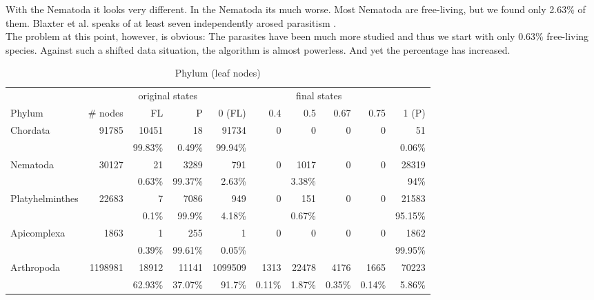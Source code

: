       With the Nematoda it looks very different. In the Nematoda its much worse. Most Nematoda are 
        free-living, but we found only 2.63\% of them. Blaxter et al. speaks of at least seven 
        independently arosed parasitism \cite{Blaxter1998}. \\
        The problem at this point, however, is obvious: The parasites have been much more studied and 
        thus we start with only 0.63\% free-living species. Against such a shifted data situation, the 
        algorithm is almost powerless. And yet the percentage has increased.

      \begin{table}
        \begin{center}
          \hspace*{-1cm}\begin{tabular}{ |l|r||r|r||r|r|r|r|r|r| }
            \hline
            & & \multicolumn{2}{c||}{original states} & \multicolumn{6}{c|}{final states} \\
            Phylum & \# nodes & FL & P
              & 0 (FL) & 0.4 & 0.5 & 0.67 & 0.75 & 1 (P) \\
            \hline \hline
            Chordata & 91785 & 10451 & 18 
              & 91734 & 0 & 0 & 0 & 0 & 51 \\
            & & 99.83\% & 0.49\%
              & 99.94\% & & & & & 0.06\% \\ \hline
            Nematoda & 30127 & 21 & 3289 
              & 791 & 0 & 1017 & 0 & 0 & 28319 \\
            & & 0.63\% & 99.37\%
              & 2.63\% & & 3.38\% & & & 94\% \\ \hline
            Platyhelminthes & 22683 & 7 & 7086 
              & 949 & 0 & 151 & 0 & 0 & 21583 \\
            & & 0.1\% & 99.9\%
              & 4.18\% & & 0.67\% & & & 95.15\% \\ \hline
            Apicomplexa & 1863 & 1 & 255 
              & 1 & 0 & 0 & 0 & 0 & 1862 \\
            & & 0.39\% & 99.61\%
              & 0.05\% & & & & & 99.95\% \\
            \hline \hline
            Arthropoda & 1198981 & 18912 & 11141 
              & 1099509 & 1313 & 22478 & 4176 & 1665 & 70223 \\
            & & 62.93\% & 37.07\%
              & 91.7\% & 0.11\% & 1.87\% & 0.35\% & 0.14\% & 5.86\% \\
            \hline
          \end{tabular} 
        \end{center}
        \caption{Phylum (leaf nodes)}
        \label{table:phylum leaf nodes states} 
      \end{table}

